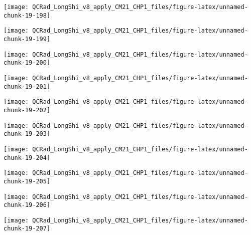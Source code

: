 \documentclass[
  10pt,
  a4paper,oneside]{article}
\begin{document}
\begin{center}\texttt{[image: QCRad\_LongShi\_v8\_apply\_CM21\_CHP1\_files/figure-latex/unnamed-chunk-19-198]} \end{center}

\begin{center}\texttt{[image: QCRad\_LongShi\_v8\_apply\_CM21\_CHP1\_files/figure-latex/unnamed-chunk-19-199]} \end{center}

\begin{center}\texttt{[image: QCRad\_LongShi\_v8\_apply\_CM21\_CHP1\_files/figure-latex/unnamed-chunk-19-200]} \end{center}

\begin{center}\texttt{[image: QCRad\_LongShi\_v8\_apply\_CM21\_CHP1\_files/figure-latex/unnamed-chunk-19-201]} \end{center}

\begin{center}\texttt{[image: QCRad\_LongShi\_v8\_apply\_CM21\_CHP1\_files/figure-latex/unnamed-chunk-19-202]} \end{center}

\begin{center}\texttt{[image: QCRad\_LongShi\_v8\_apply\_CM21\_CHP1\_files/figure-latex/unnamed-chunk-19-203]} \end{center}

\begin{center}\texttt{[image: QCRad\_LongShi\_v8\_apply\_CM21\_CHP1\_files/figure-latex/unnamed-chunk-19-204]} \end{center}

\begin{center}\texttt{[image: QCRad\_LongShi\_v8\_apply\_CM21\_CHP1\_files/figure-latex/unnamed-chunk-19-205]} \end{center}

\begin{center}\texttt{[image: QCRad\_LongShi\_v8\_apply\_CM21\_CHP1\_files/figure-latex/unnamed-chunk-19-206]} \end{center}

\begin{center}\texttt{[image: QCRad\_LongShi\_v8\_apply\_CM21\_CHP1\_files/figure-latex/unnamed-chunk-19-207]} \end{center}
\end{document}
